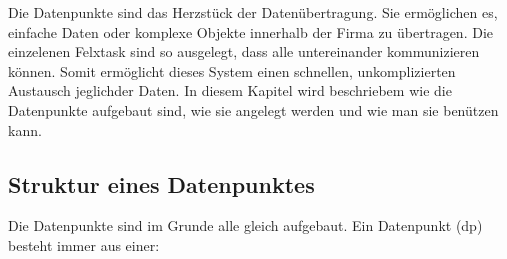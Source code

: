 Die Datenpunkte sind das Herzstück der Datenübertragung. Sie ermöglichen es, einfache Daten oder komplexe Objekte innerhalb der Firma zu übertragen. Die einzelenen Felxtask sind so ausgelegt, dass alle untereinander kommunizieren können. Somit ermöglicht dieses System einen schnellen, unkomplizierten Austausch jeglichder Daten. In diesem Kapitel wird beschriebem wie die Datenpunkte aufgebaut sind, wie sie angelegt werden und wie man sie benützen kann.

\subsection{Struktur eines Datenpunktes}\label{Datenpunkte} 

Die Datenpunkte sind im Grunde alle gleich aufgebaut. Ein Datenpunkt (dp) besteht immer aus einer:

